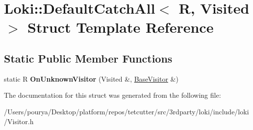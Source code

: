 \hypertarget{structLoki_1_1DefaultCatchAll}{}\section{Loki\+:\+:Default\+Catch\+All$<$ R, Visited $>$ Struct Template Reference}
\label{structLoki_1_1DefaultCatchAll}
\subsection*{Static Public Member Functions}
\begin{DoxyCompactItemize}
\item 
\hypertarget{structLoki_1_1DefaultCatchAll_a6ac34eeceaae98e6b52af8835187acb2}{}static R {\bfseries On\+Unknown\+Visitor} (Visited \&, \hyperlink{classLoki_1_1BaseVisitor}{Base\+Visitor} \&)\label{structLoki_1_1DefaultCatchAll_a6ac34eeceaae98e6b52af8835187acb2}

\end{DoxyCompactItemize}


The documentation for this struct was generated from the following file\+:\begin{DoxyCompactItemize}
\item 
/\+Users/pourya/\+Desktop/platform/repos/tetcutter/src/3rdparty/loki/include/loki/Visitor.\+h\end{DoxyCompactItemize}
